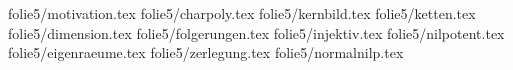 %
%
%
folie{5/motivation.tex}
folie{5/charpoly.tex}
folie{5/kernbild.tex}
folie{5/ketten.tex}
folie{5/dimension.tex}
folie{5/folgerungen.tex}
folie{5/injektiv.tex}
folie{5/nilpotent.tex}
folie{5/eigenraeume.tex}
folie{5/zerlegung.tex}
folie{5/normalnilp.tex}
